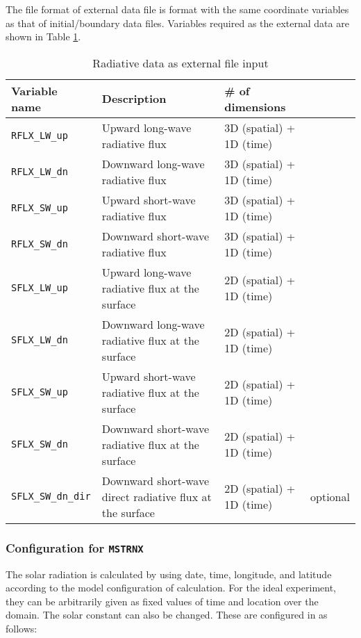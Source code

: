 \noindent
The file format of external data file is \netcdf format
with the same coordinate variables as that of initial/boundary data files.
Variables required as the external data are shown in Table \ref{tab:var_list_atm_rd_offline}.\\

\begin{table}[h]
\begin{center}
  \caption{Radiative data as external file input}
  \label{tab:var_list_atm_rd_offline}
  \begin{tabularx}{150mm}{lXll} \hline
    \rowcolor[gray]{0.9}  Variable name & Description & \# of dimensions & \\ \hline
      \verb|RFLX_LW_up|     & Upward long-wave radiative flux & 3D (spatial) + 1D (time) \\
      \verb|RFLX_LW_dn|     & Downward long-wave radiative flux & 3D (spatial) + 1D (time) \\
      \verb|RFLX_SW_up|     & Upward short-wave radiative flux & 3D (spatial) + 1D (time) \\
      \verb|RFLX_SW_dn|     & Downward short-wave radiative flux & 3D (spatial) + 1D (time) \\
      \verb|SFLX_LW_up|     & Upward long-wave radiative flux at the surface & 2D (spatial) + 1D (time) \\
      \verb|SFLX_LW_dn|     & Downward long-wave radiative flux at the surface & 2D (spatial) + 1D (time) \\
      \verb|SFLX_SW_up|     & Upward short-wave radiative flux at the surface & 2D (spatial) + 1D (time) \\
      \verb|SFLX_SW_dn|     & Downward short-wave radiative flux at the surface & 2D (spatial) + 1D (time) \\
      \verb|SFLX_SW_dn_dir| & Downward short-wave direct radiative flux at the surface & 2D (spatial) + 1D (time) & optional \\
    \hline
  \end{tabularx}
\end{center}
\end{table}

\subsubsection{Configuration for \texttt{MSTRNX}}

The solar radiation is calculated by using date, time, longitude, and latitude according to the model configuration of calculation.
For the ideal experiment, they can be arbitrarily given as fixed values of time and location over the domain.
The solar constant can also be changed. These are configured in  as follows:

